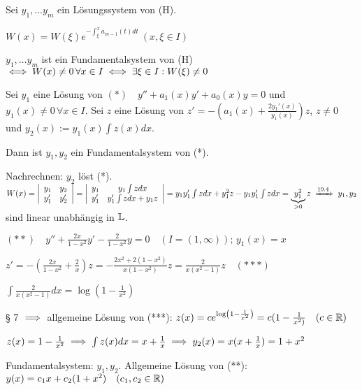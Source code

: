 \documentclass[a4paper,twoside,DIV15,BCOR12mm]{scrbook}
\begin{document}
\begin{satz} %
Sei $y_1, \ldots y_m$ ein Lösungssystem von (H).
\begin{liste} 
\item $W(x) = W(\xi)e^{-\int_{\xi}^{x}a_{m-1}(t)dt} \  (x, \xi \in I)$
\item $y_1, \ldots y_m$ ist ein Fundamentalsystem von (H) $\iff W(x) \neq 0 \, \forall x \in I \iff \exists \xi \in I: W(\xi) \neq 0$
\end{liste}
\end{satz}

\begin{satz}[Reduktionsverfahren von d'Alembert ($m=2$)]
Sei $y_1$ eine Lösung von $(*)\quad y''+a_1(x)y'+a_0(x)y=0$ und $y_1(x) \neq 0 \, \forall x \in I$. Sei $z$ eine Lösung von $z'=-(a_1(x) + \frac{2y_1'(x)}{y_1(x)})z$, $z \neq 0$ und $y_2(x):=y_1(x)\int z(x)dx$.

Dann ist $y_1, y_2$ ein Fundamentalsystem von (*).
\end{satz}

\begin{beweis}
Nachrechnen: $y_2$ löst (*).
$W(x)=\left|\begin{array}{cc} y_1 & y_2 \\ y_1' & y_2'\end{array}\right| =
\left|\begin{array}{cc} y_1 & y_1\int zdx \\ y_1' & y_1'\int zdx + y_1 z
\end{array}\right| =\\ y_1y_1'\int zdx+y_1^2z-y_1y_1'\int zdx = 
\underbrace{y_1^2}_{>0}z \folgtnach{19.4} y_1, y_2$ sind linear unabhängig in
$\mathbb{L}$.

\end{beweis}

\begin{beispiel}
$(**)\quad y''+\frac{2x}{1-x^2}y'-\frac{2}{1-x^2}y = 0\quad (I=(1,\infty)); \, y_1(x)=x$

$z'=-(\frac{2x}{1-x^2}+\frac{2}{x})z = - \frac{2x^2+2(1-x^2)}{x(1-x^2)}z = \frac{2}{x(x^2-1)}z\quad (***)$

$\int \frac{2}{x(x^2-1)}dx = \log (1-\frac{1}{x^2})$

§ 7 $\implies$ allgemeine Lösung von (***): $z(x) = c e^{\log (1-\frac{1}{x^2})} = c(1-\frac{1}{x^2)} \quad (c \in \mathbb{R})$

$z(x) = 1 - \frac{1}{x^2} \implies \int z(x) dx = x + \frac{1}{x} \implies y_2(x) = x(x+\frac{1}{x}) = 1 + x^2$

Fundamentalsystem: $y_1, y_2$. Allgemeine Lösung von (**): $y(x) = c_1x+c_2(1+x^2)\quad (c_1, c_2 \in \mathbb{R})$
\end{beispiel}
\end{document}
